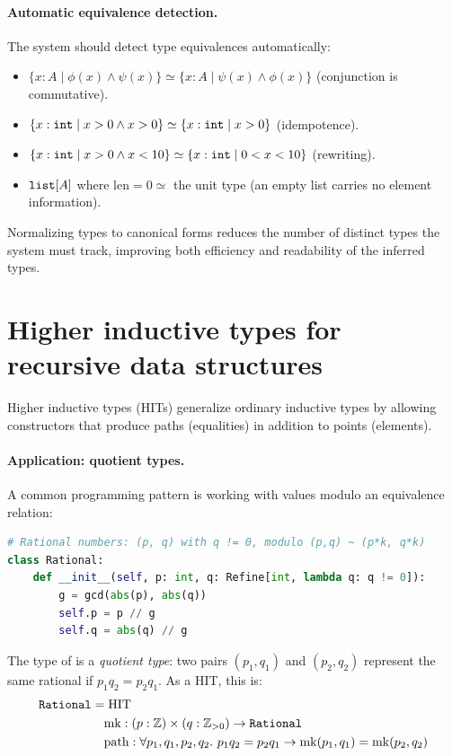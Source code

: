 \documentclass[11pt]{report}
\DeclareRobustCommand{\py}[1]{\texttt{\detokenize{#1}}}
\theoremstyle{definition}
\theoremstyle{plain}
\begin{document}
\paragraph{Automatic equivalence detection.}
The system should detect type equivalences automatically:
\begin{itemize}[nosep]
  \item $\{x : A \mid \phi(x) \wedge \psi(x)\} \simeq
        \{x : A \mid \psi(x) \wedge \phi(x)\}$
        (conjunction is commutative).
  \item $\{x : \py{int} \mid x > 0 \wedge x > 0\} \simeq
        \{x : \py{int} \mid x > 0\}$ (idempotence).
  \item $\{x : \py{int} \mid x > 0 \wedge x < 10\} \simeq
        \{x : \py{int} \mid 0 < x < 10\}$ (rewriting).
  \item $\py{list}[A]$ where $\mathrm{len} = 0 \simeq$ the unit type (an
        empty list carries no element information).
\end{itemize}

Normalizing types to canonical forms reduces the number of distinct types
the system must track, improving both efficiency and readability of the
inferred types.

\section{Higher inductive types for recursive data structures}

Higher inductive types (HITs) generalize ordinary inductive types by allowing
constructors that produce paths (equalities) in addition to points (elements).

\paragraph{Application: quotient types.}
A common programming pattern is working with values modulo an equivalence
relation:
\begin{lstlisting}[style=deppy,language=Python]
# Rational numbers: (p, q) with q != 0, modulo (p,q) ~ (p*k, q*k)
class Rational:
    def __init__(self, p: int, q: Refine[int, lambda q: q != 0]):
        g = gcd(abs(p), abs(q))
        self.p = p // g
        self.q = abs(q) // g
\end{lstlisting}

The type of \py{Rational} is a \emph{quotient type}: two pairs $(p_1, q_1)$
and $(p_2, q_2)$ represent the same rational if $p_1 q_2 = p_2 q_1$. As a
HIT, this is:
\begin{align*}
  \py{Rational} &= \mathrm{HIT} \\
  &\quad \mathrm{mk} : (p : \mathbb{Z}) \times (q : \mathbb{Z}_{> 0})
    \to \py{Rational} \\
  &\quad \mathrm{path} : \forall p_1, q_1, p_2, q_2.\
    p_1 q_2 = p_2 q_1 \to \mathrm{mk}(p_1, q_1) = \mathrm{mk}(p_2, q_2)
\end{align*}
\end{document}
